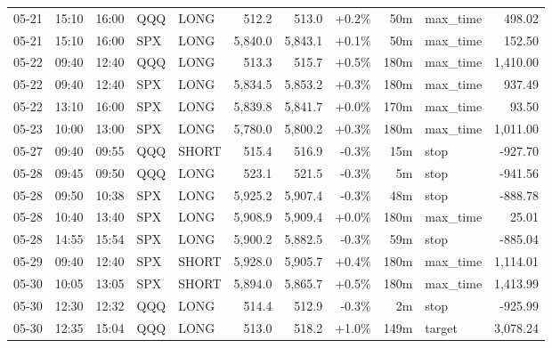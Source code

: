 \documentclass[11pt,a4paper,twoside]{article}
\begin{document}
\begin{center}
\begin{longtable}{>{\color{txtmain}}l l l l l r r r r >{\color{txtmain}}l r}
05-21 & 15:10 & 16:00 & QQQ & LONG & 512.2 & 513.0 & \textcolor{wingreen}{+0.2\%} & 50m & max\_time & \textcolor{wingreen}{498.02} \\
05-21 & 15:10 & 16:00 & SPX & LONG & 5,840.0 & 5,843.1 & \textcolor{wingreen}{+0.1\%} & 50m & max\_time & \textcolor{wingreen}{152.50} \\
05-22 & 09:40 & 12:40 & QQQ & LONG & 513.3 & 515.7 & \textcolor{wingreen}{+0.5\%} & 180m & max\_time & \textcolor{wingreen}{1,410.00} \\
05-22 & 09:40 & 12:40 & SPX & LONG & 5,834.5 & 5,853.2 & \textcolor{wingreen}{+0.3\%} & 180m & max\_time & \textcolor{wingreen}{937.49} \\
05-22 & 13:10 & 16:00 & SPX & LONG & 5,839.8 & 5,841.7 & \textcolor{wingreen}{+0.0\%} & 170m & max\_time & \textcolor{wingreen}{93.50} \\
05-23 & 10:00 & 13:00 & SPX & LONG & 5,780.0 & 5,800.2 & \textcolor{wingreen}{+0.3\%} & 180m & max\_time & \textcolor{wingreen}{1,011.00} \\
05-27 & 09:40 & 09:55 & QQQ & SHORT & 515.4 & 516.9 & \textcolor{lossred}{-0.3\%} & 15m & stop & \textcolor{lossred}{-927.70} \\
05-28 & 09:45 & 09:50 & QQQ & LONG & 523.1 & 521.5 & \textcolor{lossred}{-0.3\%} & 5m & stop & \textcolor{lossred}{-941.56} \\
05-28 & 09:50 & 10:38 & SPX & LONG & 5,925.2 & 5,907.4 & \textcolor{lossred}{-0.3\%} & 48m & stop & \textcolor{lossred}{-888.78} \\
05-28 & 10:40 & 13:40 & SPX & LONG & 5,908.9 & 5,909.4 & \textcolor{wingreen}{+0.0\%} & 180m & max\_time & \textcolor{wingreen}{25.01} \\
05-28 & 14:55 & 15:54 & SPX & LONG & 5,900.2 & 5,882.5 & \textcolor{lossred}{-0.3\%} & 59m & stop & \textcolor{lossred}{-885.04} \\
05-29 & 09:40 & 12:40 & SPX & SHORT & 5,928.0 & 5,905.7 & \textcolor{wingreen}{+0.4\%} & 180m & max\_time & \textcolor{wingreen}{1,114.01} \\
05-30 & 10:05 & 13:05 & SPX & SHORT & 5,894.0 & 5,865.7 & \textcolor{wingreen}{+0.5\%} & 180m & max\_time & \textcolor{wingreen}{1,413.99} \\
05-30 & 12:30 & 12:32 & QQQ & LONG & 514.4 & 512.9 & \textcolor{lossred}{-0.3\%} & 2m & stop & \textcolor{lossred}{-925.99} \\
05-30 & 12:35 & 15:04 & QQQ & LONG & 513.0 & 518.2 & \textcolor{wingreen}{+1.0\%} & 149m & target & \textcolor{wingreen}{3,078.24} \\

\end{longtable}
\end{center}
\end{document}
